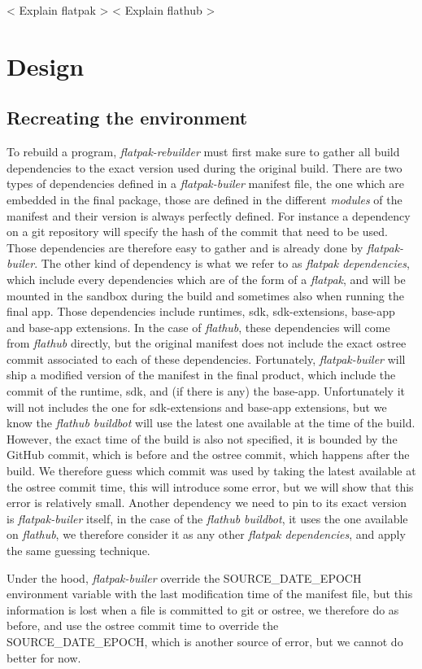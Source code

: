 \documentclass[a4paper,11pt,oneside]{report}
\theoremstyle{definition}
\newcommand{\sysname}{\emph{flatpak-rebuilder}\xspace}
\newcommand{\fp}{\emph{flatpak}\xspace}
\newcommand{\fh}{\emph{flathub}\xspace}
\newcommand{\fb}{\emph{flatpak-builer}\xspace}
\newcommand{\fdp}{\emph{flatpak dependencies}\xspace}
\newcommand{\sde}{SOURCE\_DATE\_EPOCH\xspace}
\newcommand{\fhbb}{\emph{flathub buildbot}\xspace}
\begin{document}
< Explain flatpak >
< Explain flathub >

\chapter{Design}

\section{Recreating the environment}
To rebuild a program, \sysname must first make sure to gather all build
dependencies to the exact version used during the original build. There are two
types of dependencies defined in a \fb manifest file, the one which are
embedded in the final package, those are defined in the different
\emph{modules} of the manifest and their version is always perfectly defined.
For instance a dependency on a git repository will specify the hash of the
commit that need to be used. Those dependencies are therefore easy to gather
and is already done by \fb.
The other kind of dependency is what we refer to as \fdp, which include every
dependencies which are of the form of a \fp, and will be mounted in the
sandbox during the build and sometimes also when running the final app. Those
dependencies include runtimes, sdk, sdk-extensions, base-app and base-app
extensions. In the case of \fh, these dependencies will come from \fh directly,
but the original manifest does not include the exact ostree commit associated
to each of these dependencies.
Fortunately, \fb will ship a modified version of the manifest in the final
product, which include the commit of the runtime, sdk, and (if there is any)
the base-app. Unfortunately it will not includes the one for sdk-extensions and
base-app extensions, but we know the \fhbb will use the latest one
available at the time of the build. However, the exact time of the build is
also not specified, it is bounded by the GitHub commit, which is before and the
ostree commit, which happens after the build.
We therefore guess which commit was used by taking the latest available at the
ostree commit time, this will introduce some error, but we will show that this
error is relatively small.
Another dependency we need to pin to its exact version is \fb itself, in the
case of the \fhbb, it uses the one available on \fh, we therefore
consider it as any other \fdp, and apply the same guessing technique.

Under the hood, \fb override the \sde environment variable with the last
modification time of the manifest file, but this information is lost when a
file is committed to git or ostree, we therefore do as before, and use the
ostree commit time to override the \sde, which is another source of error, but
we cannot do better for now.
\end{document}
